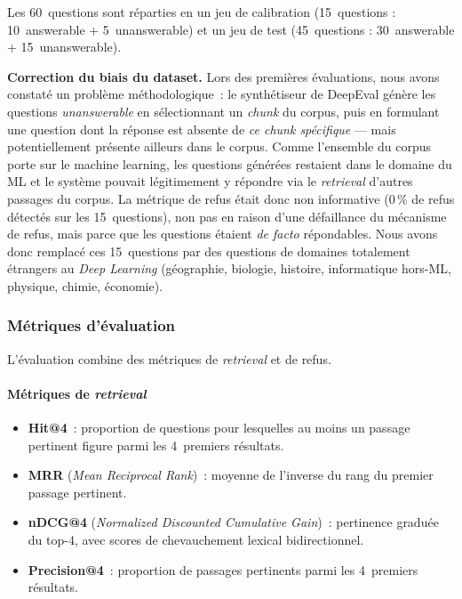 \documentclass[11pt,a4paper]{article}
\begin{document}
Les 60~questions sont réparties en un jeu de calibration (15~questions : 10~answerable + 5~unanswerable) et un jeu de test (45~questions : 30~answerable + 15~unanswerable).

\textbf{Correction du biais du dataset.} Lors des premières évaluations, nous avons constaté un problème méthodologique~: le synthétiseur de DeepEval génère les questions \textit{unanswerable} en sélectionnant un \textit{chunk} du corpus, puis en formulant une question dont la réponse est absente de \textit{ce chunk spécifique} --- mais potentiellement présente ailleurs dans le corpus. Comme l'ensemble du corpus porte sur le machine learning, les questions générées restaient dans le domaine du ML et le système pouvait légitimement y répondre via le \textit{retrieval} d'autres passages du corpus. La métrique de refus était donc non informative (0\,\% de refus détectés sur les 15~questions), non pas en raison d'une défaillance du mécanisme de refus, mais parce que les questions étaient \textit{de facto} répondables. Nous avons donc remplacé ces 15~questions par des questions de domaines totalement étrangers au \textit{Deep Learning} (géographie, biologie, histoire, informatique hors-ML, physique, chimie, économie).

\subsubsection{Métriques d'évaluation}

L'évaluation combine des métriques de \textit{retrieval} et de refus.

\paragraph{Métriques de \textit{retrieval}}

\begin{itemize}
  \item \textbf{Hit@4}~: proportion de questions pour lesquelles au moins un passage pertinent figure parmi les 4~premiers résultats.
  \item \textbf{MRR} (\textit{Mean Reciprocal Rank})~: moyenne de l'inverse du rang du premier passage pertinent.
  \item \textbf{nDCG@4} (\textit{Normalized Discounted Cumulative Gain})~: pertinence graduée du top-4, avec scores de chevauchement lexical bidirectionnel.
  \item \textbf{Precision@4}~: proportion de passages pertinents parmi les 4~premiers résultats.
\end{itemize}
\end{document}
